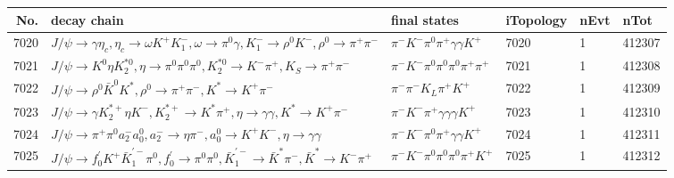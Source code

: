 \begin{table}[htbp] 
\begin{center}
\begin{small}
\begin{tabular}{rlllll}\hline\hline
 No. & decay chain & final states &  iTopology & nEvt & nTot \\\hline
7020&$J/\psi       \rightarrow \gamma       \eta_{c}    , \eta_{c}     \rightarrow \omega         K^{+}          K_{1}^{-}      , \omega          \rightarrow \pi^{0}        \gamma       , K_{1}^{-}       \rightarrow \rho^{0}      K^{-}          , \rho^{0}       \rightarrow \pi^{+}        \pi^{-}        $&$\pi^{-}        K^{-}          \pi^{0}        \pi^{+}        \gamma       \gamma       K^{+}          $& 7020&    1&412307\\
7021&$J/\psi       \rightarrow K^{0}          \eta          K_2^{*0}       , \eta           \rightarrow \pi^{0}        \pi^{0}        \pi^{0}        , K_2^{*0}        \rightarrow K^{-}          \pi^{+}        , K_{S}           \rightarrow \pi^{+}        \pi^{-}        $&$\pi^{-}        K^{-}          \pi^{0}        \pi^{0}        \pi^{0}        \pi^{+}        \pi^{+}        $& 7021&    1&412308\\
7022&$J/\psi       \rightarrow \rho^{0}      \bar{K}^{0}   K^{*}          , \rho^{0}       \rightarrow \pi^{+}        \pi^{-}        , K^{*}           \rightarrow K^{+}          \pi^{-}        $&$\pi^{-}        \pi^{-}        K_{L}          \pi^{+}        K^{+}          $& 7022&    1&412309\\
7023&$J/\psi       \rightarrow \gamma       K_2^{*+}       \eta          K^{-}          , K_2^{*+}        \rightarrow K^{*}          \pi^{+}        , \eta           \rightarrow \gamma       \gamma       , K^{*}           \rightarrow K^{+}          \pi^{-}        $&$\pi^{-}        K^{-}          \pi^{+}        \gamma       \gamma       \gamma       K^{+}          $& 7023&    1&412310\\
7024&$J/\psi       \rightarrow \pi^{+}        \pi^{0}        a_{2}^{-}      a_{0}^{0}      , a_{2}^{-}       \rightarrow \eta          \pi^{-}        , a_{0}^{0}       \rightarrow K^{+}          K^{-}          , \eta           \rightarrow \gamma       \gamma       $&$\pi^{-}        K^{-}          \pi^{0}        \pi^{+}        \gamma       \gamma       K^{+}          $& 7024&    1&412311\\
7025&$J/\psi       \rightarrow f^{'}_{0}     K^{+}          \bar{K}_1^{'-}\pi^{0}        , f^{'}_{0}      \rightarrow \pi^{0}        \pi^{0}        , \bar{K}_1^{'-} \rightarrow \bar{K}^{*}   \pi^{-}        , \bar{K}^{*}    \rightarrow K^{-}          \pi^{+}        $&$\pi^{-}        K^{-}          \pi^{0}        \pi^{0}        \pi^{0}        \pi^{+}        K^{+}          $& 7025&    1&412312\\

\end{tabular}
\end{small}
\end{center}
\end{table}
